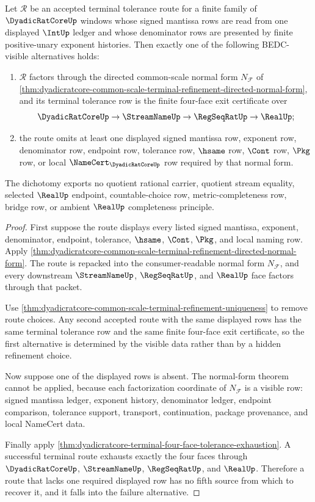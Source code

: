 \begin{theorem}
\label{thm:dyadicratcore-common-scale-terminal-dichotomy}
Let $\mathcal{R}$ be an accepted terminal tolerance route for a finite family of $\DyadicRatCoreUp$ windows whose signed mantissa rows are read from one displayed $\IntUp$ ledger and whose denominator rows are presented by finite positive-unary exponent histories. Then exactly one of the following BEDC-visible alternatives holds:
\begin{enumerate}
\item $\mathcal{R}$ factors through the directed common-scale normal form $N_{\mathcal{F}}$ of \autoref{thm:dyadicratcore-common-scale-terminal-refinement-directed-normal-form}, and its terminal tolerance row is the finite four-face exit certificate over
$$
\DyadicRatCoreUp \to \StreamNameUp \to \RegSeqRatUp \to \RealUp ;
$$
\item the route omits at least one displayed signed mantissa row, exponent row, denominator row, endpoint row, tolerance row, $\hsame$ row, $\Cont$ row, $\Pkg$ row, or local $\NameCert_{\DyadicRatCoreUp}$ row required by that normal form.
\end{enumerate}
The dichotomy exports no quotient rational carrier, quotient stream equality, selected $\RealUp$ endpoint, countable-choice row, metric-completeness row, bridge row, or ambient $\RealUp$ completeness principle.
\end{theorem}
\begin{proof}
First suppose the route displays every listed signed mantissa, exponent, denominator, endpoint, tolerance, $\hsame$, $\Cont$, $\Pkg$, and local naming row. Apply \autoref{thm:dyadicratcore-common-scale-terminal-refinement-directed-normal-form}. The route is repacked into the consumer-readable normal form $N_{\mathcal{F}}$, and every downstream $\StreamNameUp$, $\RegSeqRatUp$, and $\RealUp$ face factors through that packet.

Use \autoref{thm:dyadicratcore-common-scale-terminal-refinement-uniqueness} to remove route choices. Any second accepted route with the same displayed rows has the same terminal tolerance row and the same finite four-face exit certificate, so the first alternative is determined by the visible data rather than by a hidden refinement choice.

Now suppose one of the displayed rows is absent. The normal-form theorem cannot be applied, because each factorization coordinate of $N_{\mathcal{F}}$ is a visible row: signed mantissa ledger, exponent history, denominator ledger, endpoint comparison, tolerance support, transport, continuation, package provenance, and local NameCert data.

Finally apply \autoref{thm:dyadicratcore-terminal-four-face-tolerance-exhaustion}. A successful terminal route exhausts exactly the four faces through $\DyadicRatCoreUp$, $\StreamNameUp$, $\RegSeqRatUp$, and $\RealUp$. Therefore a route that lacks one required displayed row has no fifth source from which to recover it, and it falls into the failure alternative.
\end{proof}
